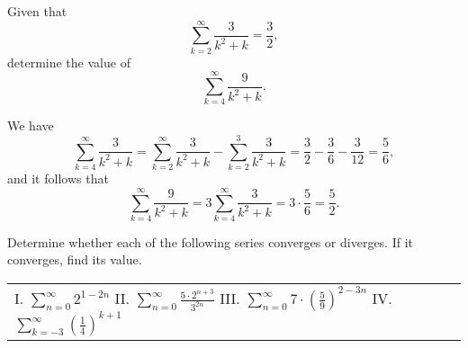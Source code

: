 \documentclass[]{ximera}
\begin{document}
\begin{problem}
Given that 
$$
\sum_{k=2}^\infty \frac{3}{k^2 + k} = \frac{3}{2},
$$
determine the value of 
$$
\sum_{k=4}^\infty \frac{9}{k^2 + k}.
$$
\end{problem}

\begin{freeResponse}
We have
$$
\sum_{k=4}^\infty \frac{3}{k^2 + k} = \sum_{k=2}^\infty \frac{3}{k^2 + k} - \sum_{k=2}^3 \frac{3}{k^2 + k} = \frac{3}{2} - \frac{3}{6} - \frac{3}{12} = \frac{5}{6},
$$
and it follows that 
$$
\sum_{k=4}^\infty \frac{9}{k^2 + k} = 3 \sum_{k=4}^\infty \frac{3}{k^2 + k} = 3 \cdot \frac{5}{6} = \frac{5}{2}.
$$
\end{freeResponse}

\begin{problem}
Determine whether each of the following series converges or diverges. If it converges, find its value.
\begin{center}
\begin{tabular}{lll}
I. $\sum_{n=0}^\infty 2^{1-2n}$ \hspace{.2in} II. $\sum_{n=0}^\infty \frac{5 \cdot 2^{n+3}}{3^{2n}}$ \hspace{.2in} III. $\sum_{n=0}^\infty 7 \cdot \left(\frac{5}{9}\right)^{2-3n}$ \hspace{.2in} IV. $\sum_{k=-3}^\infty \left(\frac{1}{4}\right)^{k+1}$
\end{tabular}
\end{center}
\end{problem}
\end{document}
